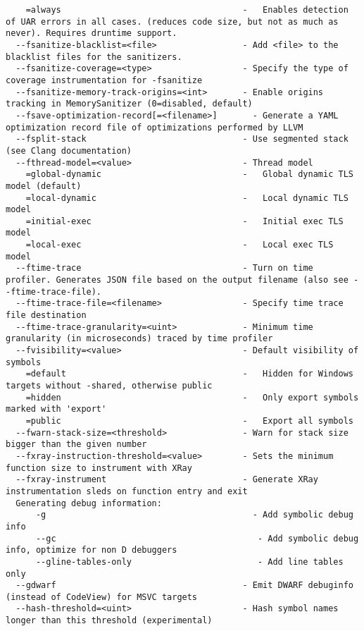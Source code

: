 \documentclass{studrep}
\begin{document}
\begin{verbatim}
    =always                                    -   Enables detection of UAR errors in all cases. (reduces code size, but not as much as never). Requires druntime support.
  --fsanitize-blacklist=<file>                 - Add <file> to the blacklist files for the sanitizers.
  --fsanitize-coverage=<type>                  - Specify the type of coverage instrumentation for -fsanitize
  --fsanitize-memory-track-origins=<int>       - Enable origins tracking in MemorySanitizer (0=disabled, default)
  --fsave-optimization-record[=<filename>]       - Generate a YAML optimization record file of optimizations performed by LLVM
  --fsplit-stack                               - Use segmented stack (see Clang documentation)
  --fthread-model=<value>                      - Thread model
    =global-dynamic                            -   Global dynamic TLS model (default)
    =local-dynamic                             -   Local dynamic TLS model
    =initial-exec                              -   Initial exec TLS model
    =local-exec                                -   Local exec TLS model
  --ftime-trace                                - Turn on time profiler. Generates JSON file based on the output filename (also see --ftime-trace-file).
  --ftime-trace-file=<filename>                - Specify time trace file destination
  --ftime-trace-granularity=<uint>             - Minimum time granularity (in microseconds) traced by time profiler
  --fvisibility=<value>                        - Default visibility of symbols
    =default                                   -   Hidden for Windows targets without -shared, otherwise public
    =hidden                                    -   Only export symbols marked with 'export'
    =public                                    -   Export all symbols
  --fwarn-stack-size=<threshold>               - Warn for stack size bigger than the given number
  --fxray-instruction-threshold=<value>        - Sets the minimum function size to instrument with XRay
  --fxray-instrument                           - Generate XRay instrumentation sleds on function entry and exit
  Generating debug information:
      -g                                         - Add symbolic debug info
      --gc                                        - Add symbolic debug info, optimize for non D debuggers
      --gline-tables-only                         - Add line tables only
  --gdwarf                                     - Emit DWARF debuginfo (instead of CodeView) for MSVC targets
  --hash-threshold=<uint>                      - Hash symbol names longer than this threshold (experimental)

\end{verbatim}
\end{document}
